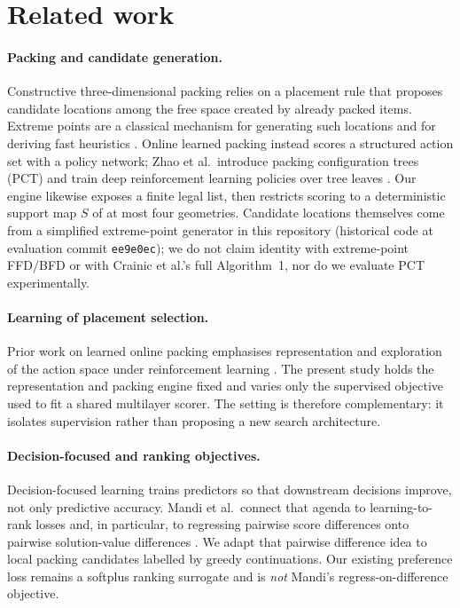 \section{Related work}

\paragraph{Packing and candidate generation.}
Constructive three-dimensional packing relies on a placement rule that proposes
candidate locations among the free space created by already packed items. Extreme
points are a classical mechanism for generating such locations and for deriving
fast heuristics \citep{crainic2008extreme}. Online learned packing instead
scores a structured action set with a policy network; Zhao et al.\ introduce
packing configuration trees (PCT) and train deep reinforcement learning policies
over tree leaves \citep{zhao2022pct}. Our engine likewise exposes a finite legal
list, then restricts scoring to a deterministic support map $S$ of at most four
geometries. Candidate locations themselves come from a simplified extreme-point
generator in this repository (historical code at evaluation commit
\texttt{ee9e0ec}); we do not claim identity with extreme-point FFD/BFD or with
Crainic et al.'s full Algorithm~1, nor do we evaluate PCT experimentally.

\paragraph{Learning of placement selection.}
Prior work on learned online packing emphasises representation and exploration of
the action space under reinforcement learning \citep{zhao2022pct}. The present
study holds the representation and packing engine fixed and varies only the
supervised objective used to fit a shared multilayer scorer. The setting is
therefore complementary: it isolates supervision rather than proposing a new
search architecture.

\paragraph{Decision-focused and ranking objectives.}
Decision-focused learning trains predictors so that downstream decisions improve,
not only predictive accuracy. Mandi et al.\ connect that agenda to learning-to-rank
losses and, in particular, to regressing pairwise score differences onto pairwise
solution-value differences \citep{mandi2022decision}. We adapt that pairwise
difference idea to local packing candidates labelled by greedy continuations.
Our existing preference loss remains a softplus ranking surrogate and is
\emph{not} Mandi's regress-on-difference objective.

